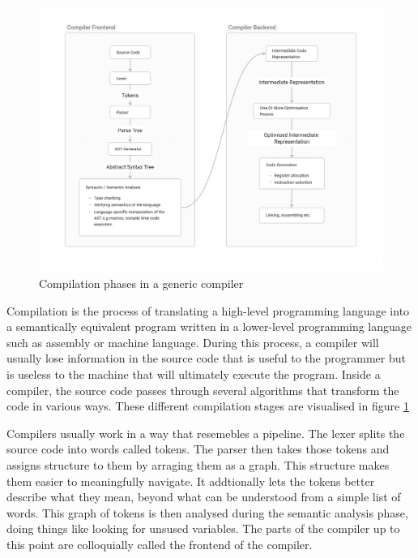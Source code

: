 \begin{figure}[t]
\includegraphics[width=\linewidth]{images/generic_compiler.png}
\centering
\caption{Compilation phases in a generic compiler}
\label{fig:compiler}
\end{figure}

Compilation is the process of translating a high-level programming language into
a semantically equivalent program written in a lower-level programming language
such as assembly or machine language. During this process, a compiler will
usually lose information in the source code that is useful to the programmer
but is useless to the machine that will ultimately execute the program. Inside
a compiler, the source code passes through several algorithms that transform
the code in various ways. These different compilation stages are visualised in
figure \ref{fig:compiler}

Compilers usually work in a way that resemebles a pipeline. The lexer splits
the source code into words called tokens. The parser then takes those tokens and
assigns structure to them by arraging them as a graph. This structure makes them
easier to meaningfully navigate. It addtionally lets the tokens better describe
what they mean, beyond what can be understood from a simple list of words.
This graph of tokens is then analysed during the semantic analysis phase, doing
things like looking for unsused variables. The parts of the compiler up to this
point are colloquially called the frontend of the compiler.

